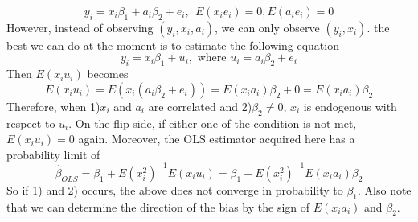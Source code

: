 \documentclass[12pt]{article}
\theoremstyle{definition}
\theoremstyle{property}
\theoremstyle{assumption}
\theoremstyle{example}
\theoremstyle{comment}
\begin{document}
\begin{itemize}
\[
y_ i = x_i\beta_1+a_i\beta_2+e_i, \ \ E(x_ie_i)=0, E(a_ie_i)=0
\]
However, instead of observing $(y_i,x_i,a_i)$, we can only observe $(y_i, x_i)$. the best we can do at the moment is to estimate the following equation
\[
y_i=x_i\beta_1+u_i,\text{ where } u_i=a_i\beta_2 + e_i
\] 
Then $E(x_iu_i)$ becomes
\[
E(x_iu_i)= E(x_i(a_i\beta_2+e_i))=E(x_ia_i)\beta_2+0 = E(x_ia_i)\beta_2
\]
Therefore, when 1)$x_i$ and $a_i$ are correlated and 2)$\beta_2\neq0$, $x_i$ is endogenous with respect to $u_i$. On the flip side, if either one of the condition is not met, $E(x_iu_i)=0$ again. Moreover, the OLS estimator acquired here has a probability limit of
\[
\hat{\beta}_{OLS}=\beta_1+E(x_i^2)^{-1}E(x_iu_i)=\beta_1+E(x_i^2)^{-1}E(x_ia_i)\beta_2
\]
So if 1) and 2) occurs, the above does not converge in probability to $\beta_1$. Also note that we can determine the direction of the bias by the sign of $E(x_ia_i)$ and $\beta_2$. 
\end{itemize}
\end{document}
